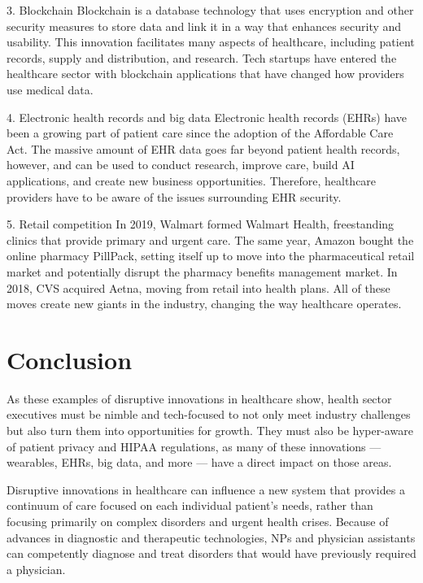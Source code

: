 \documentclass[12pt]{article}
\begin{document}
3. Blockchain             
Blockchain is a database technology that uses encryption and other security measures to store data and link it in a way that enhances security and usability. This innovation facilitates many aspects of healthcare, including patient records, supply and distribution, and research. Tech startups have entered the healthcare sector with blockchain applications that have changed how providers use medical data. 

4. Electronic health records and big data              
Electronic health records (EHRs) have been a growing part of patient care since the adoption of the Affordable Care Act. The massive amount of EHR data goes far beyond patient health records, however, and can be used to conduct research, improve care, build AI applications, and create new business opportunities. Therefore, healthcare providers have to be aware of the issues surrounding EHR security.

5. Retail competition            
In 2019, Walmart formed Walmart Health, freestanding clinics that provide primary and urgent care. The same year, Amazon bought the online pharmacy PillPack, setting itself up to move into the pharmaceutical retail market and potentially disrupt the pharmacy benefits management market. In 2018, CVS acquired Aetna, moving from retail into health plans. All of these moves create new giants in the industry, changing the way healthcare operates. 


\section{Conclusion}
As these examples of disruptive innovations in healthcare show, health sector executives must be nimble and tech-focused to not only meet industry challenges but also turn them into opportunities for growth. They must also be hyper-aware of patient privacy and HIPAA regulations, as many of these innovations — wearables, EHRs, big data, and more — have a direct impact on those areas. 

Disruptive innovations in healthcare can influence a new system that provides a continuum of care focused on each individual patient's needs, rather than focusing primarily on complex disorders and urgent health crises. Because of advances in diagnostic and therapeutic technologies, NPs and physician assistants can competently diagnose and treat disorders that would have previously required a physician.
\end{document}
